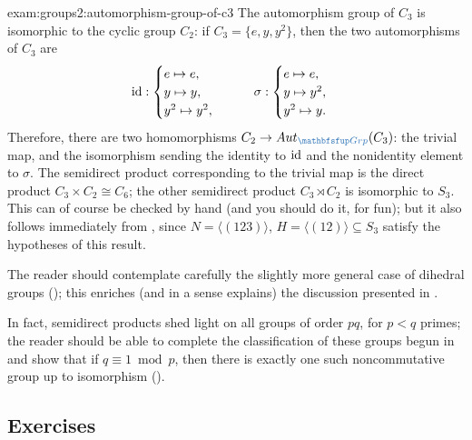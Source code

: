 \begin{exam}{}{exam:groups2:automorphism-group-of-c3}
  The automorphism group of $C_3$ is isomorphic to the cyclic group
  $C_2$: if $C_3 = \{e, y, y^2\}$, then the two automorphisms of $C_3$
  are
  \[
    \operatorname{id} : \begin{cases} e \mapsto e, \\ y \mapsto y, \\ y^2 \mapsto
      y^2,
    \end{cases}
    \qquad \sigma : \begin{cases} e \mapsto e, \\ y \mapsto y^2, \\
      y^2 \mapsto y.
    \end{cases}
  \]
  Therefore, there are two homomorphisms
  $C_2 \to \Aut_{\categ{Grp}}(C_3)$: the trivial map, and the
  isomorphism sending the identity to $\operatorname{id}$ and the nonidentity
  element to $\sigma$. The semidirect product corresponding to the
  trivial map is the direct product $C_3 \times C_2 \cong C_6$; the
  other semidirect product $C_3 \rtimes C_2$ is isomorphic to
  $S_3$. This can of course be checked by hand (and you should do it,
  for fun); but it also follows immediately from
  , since $N = \langle(123)\rangle$,
  $H = \langle(12)\rangle \subseteq S_3$ satisfy the hypotheses of
  this result.
\end{exam}
The reader should contemplate carefully the slightly more general case
of dihedral groups (); this
enriches (and in a sense explains) the discussion presented in
.

In fact, semidirect products shed light on all groups of order $pq$,
for $p < q$ primes; the reader should be able to complete the
classification of these groups begun in
 and show that if
$q \equiv 1 \bmod p$, then there is exactly one such noncommutative
group up to isomorphism ().

\subsection*{Exercises}

